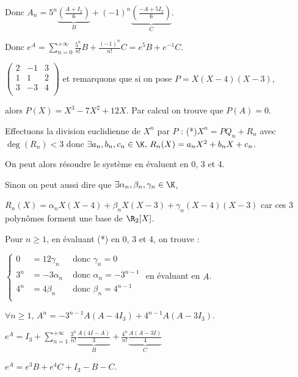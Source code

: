 \begin{exemple}
    Donc $A_n = 5^n \underbrace{\left( \frac{A + I_2} 6 \right)}_{B} + (-1)^n \underbrace{\left( \frac{-A + 5 I_2}{6} \right)}_{C}$.

    Donc $\displaystyle e^A = \sum_{n = 0}^{+\infty} \frac{5^n}{n!}B + \frac{(-1)^n}{n!} C = e^5 B + e^{-1} C$.

    
    \svspace $\begin{pmatrix}
        2 & -1 & 3\\
        1 & 1 & 2 \\
        3 & -3 & 4 \\
    \end{pmatrix}$ et remarquons que si on pose $P = X(X - 4)(X - 3)$, 
    
    alors $P(X) = X^3 - 7 X^2 + 12X$. Par calcul on trouve que $P(A) = 0$.

    Effectuons la division euclidienne de $X^n$ par $P$ : (*)$X^n = P Q_n + R_n$ avec 
    $\deg(R_n) < 3$ donc $\exists a_n, b_n, c_n \in \K, \, R_n(X) = a_n X^2 + b_n X + c_n$.

    On peut alors résoudre le système en évaluent en 0, 3 et 4. 

    Sinon on peut aussi dire que $\exists \alpha_n, \beta_n, \gamma_n \in \K$,  
    
    $R_n(X) = \alpha_n X(X - 4) + \beta_n X(X - 3) + \gamma_n (X - 4)(X - 3)$
    car ces 3 polynômes forment une base de $\R_2[X]$.

    Pour $n \geqslant 1$, en évaluant (*) en 0, 3 et 4, on trouve : 

    $\left\{ \begin{array}{rcl}
        0 & = 12 \gamma_n & \text{ donc } \gamma_n = 0\\
        3^n & = -3 \alpha_n & \text{ donc } \alpha_n = - 3^{n - 1} \\
        4^n & = 4 \beta_n & \text{ donc } \beta_n = 4^{n - 1}\\
    \end{array} \right.
    $ en évaluant en $A$. 

    $\forall n \geqslant 1, \, A^n = -3^{n - 1} A(A - 4 I_3) + 4^{n - 1} A(A - 3 I_3)$.

    $\displaystyle e^A = I_3 + \sum_{n = 1}^{+\infty} \frac{3^n}{n!} \underbrace{\frac{A(4I - A)}{3}}_B + \frac{4^n}{n!} \underbrace{\frac{A(A - 3 I)}{4}}_C$

    $e^A = e^3 B + e^4 C + I_3 - B - C$.
\end{exemple}

